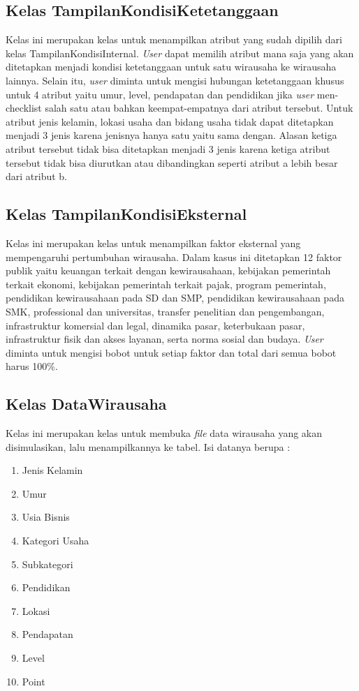\subsection{Kelas TampilanKondisiKetetanggaan}
Kelas ini merupakan kelas untuk menampilkan atribut yang sudah dipilih dari kelas TampilanKondisiInternal. \textit{User} dapat memilih atribut mana saja yang akan ditetapkan menjadi kondisi ketetanggaan untuk satu wirausaha ke wirausaha lainnya. Selain itu, \textit{user} diminta untuk mengisi hubungan ketetanggaan khusus untuk 4 atribut yaitu umur, level, pendapatan dan pendidikan jika \textit{user} men-checklist salah satu atau bahkan keempat-empatnya dari atribut tersebut. Untuk atribut jenis kelamin, lokasi usaha dan bidang usaha tidak dapat ditetapkan menjadi 3 jenis karena jenisnya hanya satu yaitu sama dengan. Alasan ketiga atribut tersebut tidak bisa ditetapkan menjadi 3 jenis karena ketiga atribut tersebut tidak bisa diurutkan atau dibandingkan seperti atribut a lebih besar dari atribut b.

\subsection{Kelas TampilanKondisiEksternal}
Kelas ini merupakan kelas untuk menampilkan faktor eksternal yang mempengaruhi pertumbuhan wirausaha. Dalam kasus ini ditetapkan 12 faktor publik yaitu keuangan terkait dengan kewirausahaan, kebijakan pemerintah terkait ekonomi, kebijakan pemerintah terkait pajak, program pemerintah, pendidikan kewirausahaan pada SD dan SMP, pendidikan kewirausahaan pada SMK, professional dan universitas, transfer penelitian dan pengembangan, infrastruktur komersial dan legal, dinamika pasar, keterbukaan pasar, infrastruktur fisik dan akses layanan, serta norma sosial dan budaya. \textit{User} diminta untuk mengisi bobot untuk setiap faktor dan total dari semua bobot harus 100\%.

\subsection{Kelas DataWirausaha}
Kelas ini merupakan kelas untuk membuka \textit{file} data wirausaha yang akan disimulasikan, lalu menampilkannya ke tabel. Isi datanya berupa :
\begin{enumerate}
	\item Jenis Kelamin
	\item Umur
	\item Usia Bisnis
	\item Kategori Usaha
	\item Subkategori
	\item Pendidikan
	\item Lokasi
	\item Pendapatan
	\item Level
	\item Point
\end{enumerate}


